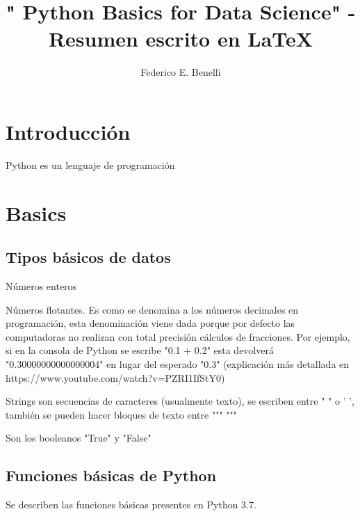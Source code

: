 \documentclass[10pt,a4paper]{article}
\author{Federico E. Benelli}
\title{" Python Basics for Data Science" - Resumen escrito en \LaTeX{}}
\begin{document}
\maketitle
\tableofcontents
\newpage

\section{Introducción}
Python es un lenguaje de programación

\section{Basics}

\subsection{Tipos básicos de datos}

\begin{description}[
align=right,
labelindent = 1cm,
labelsep=0.5cm,
itemindent=0cm]

\item [Integer]Números enteros
\item [Float]Números flotantes. Es como se denomina a los números decimales en programación, esta denominación viene dada porque por defecto las computadoras no realizan con total precisión cálculos de fracciones. Por ejemplo, si en la consola de Python se escribe "0.1 + 0.2" esta devolverá "0.30000000000000004" en lugar del esperado "0.3" (explicación más detallada en https://www.youtube.com/watch?v=PZRI1IfStY0)
\item [String]Strings son secuencias de caracteres (usualmente texto), se escriben entre " " o ' ', también se pueden hacer bloques de texto entre """ """
\item [Boolean] Son los booleanos "True" y "False"
\end{description}

\subsection{Funciones básicas de Python}
Se describen las funciones básicas presentes en Python 3.7. 
\end{document}
